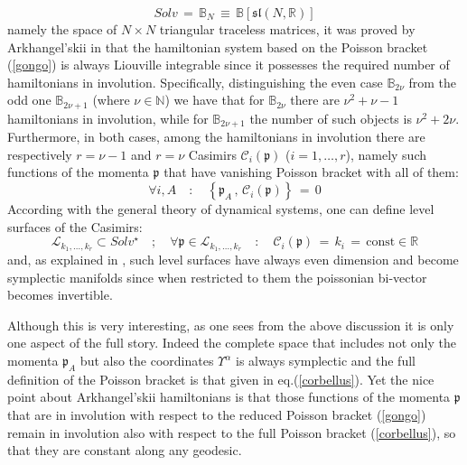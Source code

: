 \documentclass[10pt,a4paper]{article}
\newcommand{\slal}{\mathfrak{sl}}
\begin{document}
\begin{equation}\label{borelliana}
Solv \, = \, \mathbb{B}_N \, \equiv \, \mathbb{B}\left[\slal(N,\mathbb{R})\right]
\end{equation}
namely the space of $N\times N$ triangular traceless matrices, it was proved  by Arkhangel'skii in \cite{arcangelo} that the hamiltonian system based on the Poisson bracket (\ref{gongo}) is always Liouville integrable since it possesses the  required number of hamiltonians in involution. Specifically, distinguishing the even case $\mathbb{B}_{2\nu}$ from the odd one $\mathbb{B}_{2\nu+1}$ (where $\nu \in \mathbb{N}$) we have that for $\mathbb{B}_{2\nu}$ there are $\nu^2+\nu-1$ hamiltonians in involution, while for $\mathbb{B}_{2\nu+1}$  the number of such objects is $\nu^2 + 2\nu$. Furthermore, in both cases,  among the hamiltonians   in  involution there are respectively $r=\nu -1$ and $r=\nu$ Casimirs $\mathcal{C}_i(\mathfrak{p})$ ($i=1,\dots,r$), namely such functions of the momenta $\mathfrak{p}$ that have vanishing Poisson bracket with all of them:
\begin{equation}\label{casimirro}
  \forall i,A \quad : \quad  \left\{ \mathfrak{p}_A\, , \,\mathcal{C}_i(\mathfrak{p})\right\} \, = \, 0
\end{equation}
 According with the general theory of dynamical systems, one can define level surfaces of the Casimirs:
 \begin{equation}\label{livelle}
   \mathcal{L}_{k_1,\dots, k_r} \subset Solv^\star \quad ; \quad \forall \mathfrak{p} \in \mathcal{L}_{k_1,\dots, k_r} \quad
   :  \quad\mathcal{C}_i(\mathfrak{p}) \, = \, k_i \, = \, \text{const} \in \mathbb{R}
 \end{equation}
and, as explained in \cite{sashaebog}, such level surfaces have always even dimension and become symplectic manifolds since
 when restricted to them the poissonian bi-vector becomes invertible.
 \par
 Although this is very interesting, as one sees from the above discussion it is only one aspect of the full story. Indeed the complete space
 that includes not only the momenta $\mathfrak{p}_A$ but also the coordinates $\Upsilon^\alpha$ is always symplectic and the full definition of the Poisson bracket is that given in eq.(\ref{corbellus}).  Yet the nice point about Arkhangel'skii hamiltonians is that those functions of the momenta $\mathfrak{p}$ that are in involution with respect to the reduced Poisson bracket (\ref{gongo}) remain in involution also with respect to the full Poisson bracket (\ref{corbellus}), so that they are constant along any geodesic.
\end{document}
